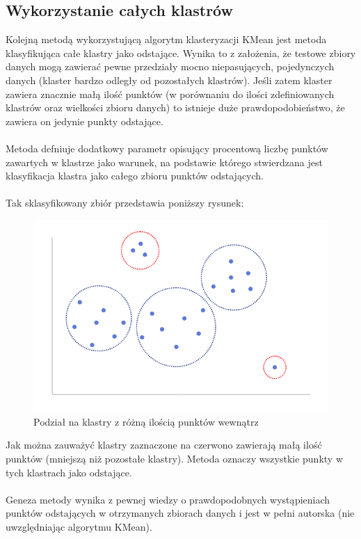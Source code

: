 \documentclass[eng,printmode]{mgr}
\begin{document}
\subsection{Wykorzystanie całych klastrów}
Kolejną metodą wykorzystującą algorytm klasteryzacji KMean jest metoda klasyfikująca całe klastry jako odstające. Wynika to z założenia, że testowe zbiory danych mogą zawierać pewne przedziały mocno niepasujących, pojedynczych danych (klaster bardzo odległy od pozostałych klastrów). Jeśli zatem klaster zawiera znacznie małą ilość punktów (w porównaniu do ilości zdefiniowanych klastrów oraz wielkości zbioru danych) to istnieje duże prawdopodobieństwo, że zawiera on jedynie punkty odstające. \\\\
Metoda defniuje dodatkowy parametr opisujący procentową liczbę punktów zawartych w klastrze jako warunek, na podstawie którego stwierdzana jest klasyfikacja klastra jako całego zbioru punktów odstających.
\\\\
Tak sklasyfikowany zbiór przedstawia poniższy rysunek:
\begin{figure}[H]
  \begin{center}
  \includegraphics[scale=0.7]{KMean_sim}
  \end{center}
  \caption{Podział na klastry z różną ilością punktów wewnątrz}
\end{figure}
Jak można zauważyć klastry zaznaczone na czerwono zawierają małą ilość punktów (mniejszą niż pozostałe klastry). Metoda oznaczy wszystkie punkty w tych klastrach jako odstające.
\\\\
Geneza metody wynika z pewnej wiedzy o prawdopodobnych wystąpieniach punktów odstających w otrzymanych zbiorach danych i jest w pełni autorska (nie uwzględniając algorytmu KMean).
\end{document}
